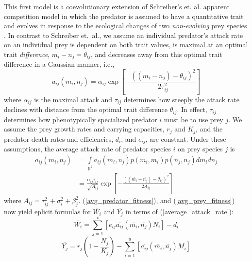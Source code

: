 \documentclass{amsart}
\theoremstyle{definition}
\theoremstyle{remark}
\numberwithin{equation}{section}
\begin{document}
This first model is a coevolutionary extension of Schreiber's et. al. apparent competition model in which the predator is assumed to have a quantitative trait and evolves in response to the ecological changes of two {\it non-evolving} prey species \cite{Schreiber_2011}.  In contrast to Schreiber et.~al., we assume an individual predator's attack rate on an individual prey is dependent on both trait values, is maximal at an optimal trait {\it difference}, $m_i - n_j = \theta_{ij}$, and decreases away from this optimal trait difference in a Gaussian manner, i.e.,
\begin{equation}
	\label{attack_rate}
	a_{ij}(m_i, n_j) = \alpha_{ij}\exp{\left[-\frac{((m_i - n_j) - \theta_{ij})^2}{2\tau_{ij}^2}\right]}
\end{equation}
where $\alpha_{ij}$ is the maximal attack and $\tau_{ij}$ determines how steeply the attack rate declines with distance from the optimal trait difference $\theta_{ij}$.  In effect, $\tau_{ij}$ determines how phenotypically specialized predator $i$ must be to use prey $j$.  We assume the prey growth rates and carrying capacities, $r_j$ and $K_j$, and the predator death rates and efficiencies, $d_i$, and $e_{ij}$, are constant.  Under these assumptions, the average attack rate of predator species $i$ on prey species $j$ is
\begin{equation}
	\label{average_attack_rate}
	\begin{aligned}
		\overline{a_{ij}}(\overline{m_i}, \overline{n_j}) &= \int\limits_{\mathbb{R}^2}a_{ij}(m_i, n_j)p(m_i, \overline{m_i})p(n_j, \overline{n_j})dm_idn_j \\
		&= \frac{\alpha_{ij}\tau_{ij}}{\sqrt{A_{ij}}}\exp{\left[-\frac{((\overline{m_i} - \overline{n_j}) - \theta_{ij})^2}{2A_{ij}}\right]}
	\end{aligned}
\end{equation}
where $A_{ij} = \tau_{ij}^2 + \sigma_i^2 + \beta_j^2$.  (\ref{avg_predator_fitness}), and (\ref{avg_prey_fitness}) now yield eplicit formulas for $\overline{W_i}$ and $\overline{Y_j}$ in terms of (\ref{average_attack_rate}):
\begin{equation}
	\label{model_1_avg_pred_fitness}
	\overline{W_i} = \sum\limits_{j = 1}^{v}\left[e_{ij}\overline{a_{ij}}(\overline{m_i}, \overline{n_j})N_i\right] - d_i
\end{equation}
\begin{equation}
	\label{model_1_avg_prey_fitness}
	\overline{Y_j} = r_j\left(1 - \frac{N_j}{K_j}\right) - \sum\limits_{i = 1}^{u}\left[\overline{a_{ij}}(\overline{m_i}, \overline{n_j})M_i\right]
\end{equation}
\end{document}

